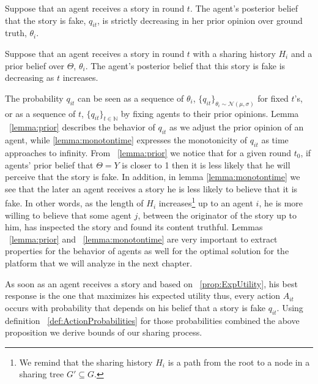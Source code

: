 \begin{lemma}
	Suppose that an agent receives a story in round $t$. The agent's posterior belief that the story is fake, $q_{it}$, is strictly decreasing in her prior opinion over ground truth, $\theta_i$.
	\label{lemma:prior}
\end{lemma}
\begin{lemma}
	Suppose that an agent receives a story in round $t$ with a sharing history $H_i$ and a prior belief over $\Theta$, $\theta_i$. The agent's posterior belief that this story is fake is decreasing as $t$ increases.
	\label{lemma:monotontime} 
\end{lemma}
The probability $q_{it}$ can be seen as a sequence of $\theta_i$, $\{q_{it}\}_{\theta_i \sim \mathcal{N} (\mu, \sigma)}$ for fixed $t$'s, or as a sequence of $t$, $\{q_{it}\}_{t \in \mathbb{N}}$ by fixing agents to their prior opinions.  Lemma ~\ref{lemma:prior} describes the behavior of $q_{it}$ as we adjust the prior opinion of an agent, while \ref{lemma:monotontime} expresses the monotonicity of $q_{it}$ as time approaches to infinity. From ~\ref{lemma:prior} we notice that for a given round $t_0$, if agents' prior belief that $\Theta = Y$ is closer to 1 then it is less likely that he will perceive that the story is fake. In addition, in lemma \ref{lemma:monotontime} we see that the later an agent receives a story he is less likely to believe that it is fake. In other words, as the length of $H_i$ increases\footnote{We remind that the sharing history $H_i$ is a path from the root to a node in a sharing tree $G' \subseteq G$.} up to an agent $i$, he is more willing to believe that some agent $j$, between the originator of the story up to him, has inspected the story and found its content truthful. Lemmas ~\ref{lemma:prior} and ~\ref{lemma:monotontime} are very important to extract properties for the behavior of agents as well for the optimal solution for the platform that we will analyze in the next chapter. 



As soon as an agent receives a story and based on ~\ref{prop:ExpUtility}, his best response is the one that maximizes his expected utility thus, every action $A_{it}$ occurs with probability that depends on his belief that a story is fake $q_{it}$. Using definition ~\ref{def:ActionProbabilities} for those probabilities combined the above proposition we derive bounds of our sharing process.

